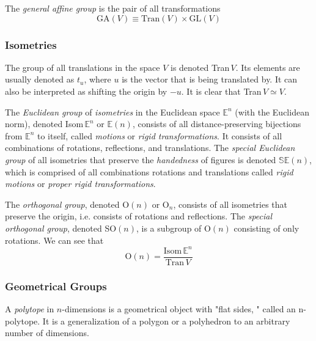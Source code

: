 \documentclass{article}
\begin{document}
\begin{definition}
  The \textit{general affine group} is the pair of all transformations
  \[ \text{GA} (V) \equiv \text{Tran}(V) \times \text{GL}(V)\]
\end{definition}

\subsubsection{Isometries}

\begin{definition}
  The group of all translations in the space $V$ is denoted Tran$\,V$. Its elements are usually denoted as $t_{u}$, where $u$ is the vector that is being translated by. It can also be interpreted as shifting the origin by $-u$. It is clear that Tran$\,V \simeq V$. 
\end{definition}

\begin{definition}
  The \textit{Euclidean group} of \textit{isometries} in the Euclidean space $\mathbb{E}^{n}$ (with the Euclidean norm), denoted Isom$\, \mathbb{E}^{n}$ or $\mathbb{E}(n)$, consists of all distance-preserving bijections from $\mathbb{E}^{n}$ to itself, called \textit{motions} or \textit{rigid transformations}. It consists of all combinations of rotations, reflections, and translations. The \textit{special Euclidean group} of all isometries that preserve the \textit{handedness} of figures is denoted $\mathbb{SE}(n)$, which is comprised of all combinations rotations and translations called \textit{rigid motions} or \textit{proper rigid transformations}.
\end{definition}

\begin{definition}
  The \textit{orthogonal group}, denoted O$(n)$ or O$_{n}$, consists of all isometries that preserve the origin, i.e. consists of rotations and reflections. The \textit{special orthogonal group}, denoted SO$(n)$, is a subgroup of O$(n)$ consisting of only rotations. We can see that 
  \[\text{O}(n)=\frac{\text{Isom}\, \mathbb{E}^{n}}{\text{Tran}\,V} \]
\end{definition}

\subsubsection{Geometrical Groups}

\begin{definition}
  A \textit{polytope} in $n$-dimensions is a geometrical object with "flat sides, " called an n-polytope. It is a generalization of a polygon or a polyhedron to an arbitrary number of dimensions. 
\end{definition}
\end{document}
